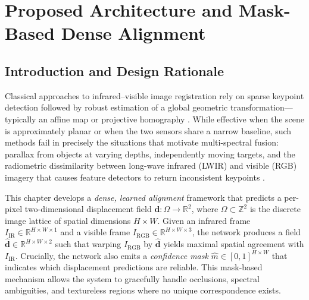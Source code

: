 
\chapter{Proposed Architecture and Mask-Based Dense Alignment}
\label{ch:proposed_architecture}

\section{Introduction and Design Rationale}
\label{sec:arch_intro}

Classical approaches to infrared--visible image registration rely on sparse
keypoint detection followed by robust estimation of a global geometric
transformation---typically an affine map or projective homography
\cite{zitova2003image}.  While effective when the scene is approximately
planar or when the two sensors share a narrow baseline, such methods fail in
precisely the situations that motivate multi-spectral fusion: parallax from
objects at varying depths, independently moving targets, and the
radiometric dissimilarity between long-wave infrared (LWIR) and visible
(RGB) imagery that causes feature detectors to return inconsistent
keypoints \cite{brown2007automatic}.

This chapter develops a \emph{dense, learned alignment} framework that
predicts a per-pixel two-dimensional displacement field
$\mathbf{d}: \Omega \rightarrow \mathbb{R}^{2}$, where $\Omega \subset
\mathbb{Z}^{2}$ is the discrete image lattice of spatial dimensions
$H \times W$.  Given an infrared frame $I_{\mathrm{IR}} \in
\mathbb{R}^{H \times W \times 1}$ and a visible frame $I_{\mathrm{RGB}}
\in \mathbb{R}^{H \times W \times 3}$, the network produces a field
$\hat{\mathbf{d}} \in \mathbb{R}^{H \times W \times 2}$ such that
warping $I_{\mathrm{RGB}}$ by $\hat{\mathbf{d}}$ yields maximal spatial
agreement with $I_{\mathrm{IR}}$.  Crucially, the network also emits a
\emph{confidence mask} $\hat{m} \in [0,1]^{H \times W}$ that indicates
which displacement predictions are reliable.  This mask-based mechanism
allows the system to gracefully handle occlusions, spectral ambiguities,
and textureless regions where no unique correspondence exists.

